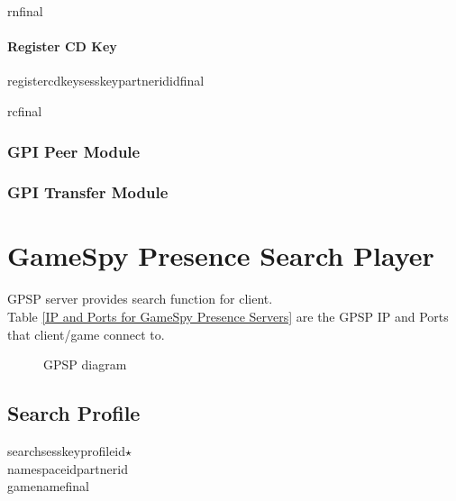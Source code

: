 \documentclass[oneside,titlepage,a4paper]{Definition/retrospy} %
\begin{document}
\ServerResponse
\begin{mybox}
	\tbs rn\tbs final\tbs
\end{mybox}


\subsubsection{Register CD Key}
\ClientRequest
\begin{mybox}
	\tbs registercdkey\tbs\tbs sesskey\tbs<session key>\tbs partnerid\tbs <partner id>\tbs id\tbs <operation id>\tbs final\tbs
\end{mybox}
\ServerResponse
\begin{mybox}
	\tbs rc\tbs final\tbs
\end{mybox}
\subsection{GPI Peer Module}
\subsection{GPI Transfer Module}



\chapter{GameSpy Presence Search Player}
GPSP server provides search function for client.\\
Table \ref{IP and Ports for GameSpy Presence Servers} are the GPSP IP and Ports that client/game connect to.

\begin{figure}[H]
	\centering
	\caption{GPSP diagram}
	\label{GPSP diagram}
\end{figure}

\section{Search Profile}
\ClientRequest 

\begin{mybox}
	\tbs search\tbs\tbs sesskey\tbs<session key>\tbs profileid\tbs <profile id>\tbs $\star$\\\tbs namespaceid\tbs<namespace id>\tbs partnerid\tbs<partner id>\\\tbs gamename\tbs<game name>\tbs final\tbs
\end{mybox}
\end{document}
